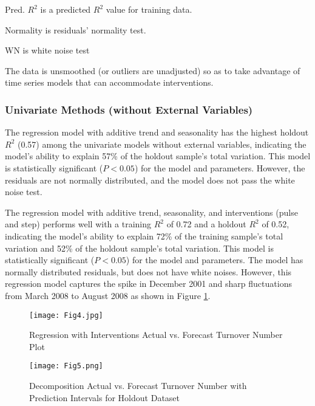 \begin{table}[htbp]
\begin{threeparttable}
\begin{tabular}{C{2cm}p{0.5cm}m{5cm}C{0.8cm}C{1.5cm}ccc}
			\hline
		\end{tabular}%
		\begin{tablenotes}
			\item[1] Pred. $R^2$ is a predicted $R^2$ value for training data.
			\item[2] Normality is residuals' normality test.
			\item[3] WN is white noise test
			\item[4] The data is unsmoothed (or outliers are unadjusted) so as to take advantage of time series models that can accommodate interventions.
		\end{tablenotes}
	\end{threeparttable}
	\label{tab:1}%
\end{table}%

\subsubsection{Univariate Methods (without External Variables)}
The regression model with additive trend and seasonality has the highest holdout $R^2$ (0.57) among the univariate models without external variables, indicating the model's ability to explain 57\% of the holdout sample's total variation. This model is statistically significant ($P<0.05$) for the model and parameters. However, the residuals are not normally distributed, and the model does not pass the white noise test. 

The regression model with additive trend, seasonality, and interventions (pulse and step) performs well with a training  $R^2$ of 0.72 and a holdout $R^2$ of 0.52, indicating the model's ability to explain 72\% of the training sample's total variation and 52\% of the holdout sample's total variation. This model is statistically significant ($P<0.05$) for the model and parameters. The model has normally distributed residuals, but does not have white noises. However, this regression model captures the spike in December 2001 and sharp fluctuations from March 2008 to August 2008 as shown in Figure \ref{fig:4}. 
\begin{figure}[h!]
	\centering
	\texttt{[image: Fig4.jpg]}
	\caption{Regression with Interventions Actual vs. Forecast Turnover Number Plot}
	\label{fig:4}
\end{figure}

\begin{figure}[h!]
	\centering
	\texttt{[image: Fig5.png]}
	\caption{Decomposition Actual vs. Forecast Turnover Number with Prediction Intervals for Holdout Dataset}
	\label{fig:5}
\end{figure}

